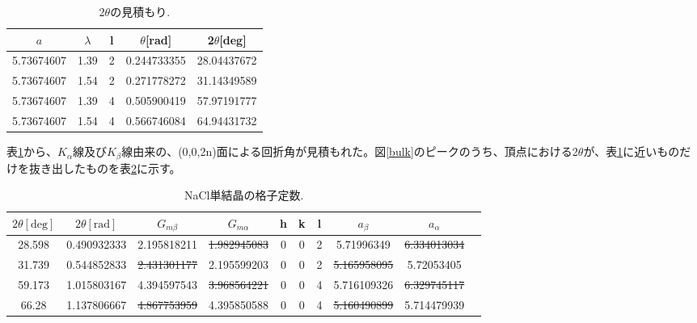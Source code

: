 \documentclass[11pt,a4j,uplatex]{jsarticle}
\begin{document}
\begin{table}[htbp]
 \begin{center}
  \caption{2$\theta$の見積もり.}
  \begin{tabular}{|c|c|c|c|c|}\hline
   $a$        & $\lambda$ & l & $\theta$[rad] & 2$\theta$[deg] \\  \hline  \hline
   5.73674607 & 1.39      & 2 & 0.244733355   & 28.04437672    \\
   5.73674607 & 1.54      & 2 & 0.271778272   & 31.14349589    \\
   5.73674607 & 1.39      & 4 & 0.505900419   & 57.97191777    \\
   5.73674607 & 1.54      & 4 & 0.566746084   & 64.94431732    \\ \hline
  \end{tabular}
  \label{gyakusan}
 \end{center}
\end{table}

\newpage
表\ref{gyakusan}から、$K_\alpha$線及び$K_\beta$線由来の、(0,0,2n)面による回折角が見積もれた。図\ref{bulk}のピークのうち、頂点における2$\theta$が、表\ref{gyakusan}に近いものだけを抜き出したものを表\ref{crystal}に示す。

\begin{table}[htbp]
 \begin{center}
  \caption{NaCl単結晶の格子定数.}
  \begin{tabular}{|c|c|c|c|ccc|c|c|c|}  \hline
   $2\theta[\mathrm{deg}]$ & $2\theta[\mathrm{rad}]$ & $G_{m\beta}$       & $G_{m\alpha}$      & h & k & l & $a_\beta$          & $a_\alpha$         \\   \hline  \hline
   28.598                  & 0.490932333             & 2.195818211        & \sout{1.982945083} & 0 & 0 & 2 & 5.71996349         & \sout{6.334013034} \\
   31.739                  & 0.544852833             & \sout{2.431301177} & 2.195599203        & 0 & 0 & 2 & \sout{5.165958095} & 5.72053405         \\
   59.173                  & 1.015803167             & 4.394597543        & \sout{3.968564221} & 0 & 0 & 4 & 5.716109326        & \sout{6.329745117} \\
   66.28                   & 1.137806667             & \sout{4.867753959} & 4.395850588        & 0 & 0 & 4 & \sout{5.160490899} & 5.714479939        \\  \hline
  \end{tabular}
  \label{crystal}
 \end{center}
\end{table}
\end{document}
